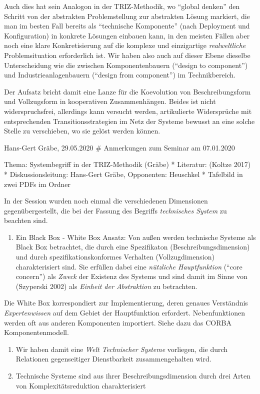 \documentclass[11pt,a4paper]{article}
\begin{document}
Auch dies hat sein Analogon in der TRIZ-Methodik, wo ``global denken''
den Schritt von der abstrakten Problemstellung zur abstrakten Lösung
markiert, die man im besten Fall bereits als ``technische Komponente''
(nach Deployment und Konfiguration) in konkrete Lösungen einbauen kann,
in den meisten Fällen aber noch eine klare Konkretisierung auf die
komplexe und einzigartige \emph{realweltliche} Problemsituation
erforderlich ist. Wir haben also auch auf dieser Ebene dieselbe
Unterscheidung wie die zwischen Komponentenbauern (``design to
component'') und Industrieanlagenbauern (``design from component'') im
Technikbereich.

Der Aufsatz bricht damit eine Lanze für die Koevolution von
Beschreibungsform und Vollzugsform in kooperativen Zusammenhängen.
Beides ist nicht widerspruchsfrei, allerdings kann versucht werden,
artikulierte Widersprüche mit entsprechenden Transitionsstrategien im
Netz der Systeme bewusst an eine solche Stelle zu verschieben, wo sie
gelöst werden können.

Hans-Gert Gräbe, 29.05.2020 \# Anmerkungen zum Seminar am 07.01.2020

Thema: Systembegriff in der TRIZ-Methodik (Gräbe) * Literatur: (Koltze
2017) * Diskussionsleitung: Hans-Gert Gräbe, Opponenten: Heuschkel *
Tafelbild in zwei PDFs im Ordner

In der Session wurden noch einmal die verschiedenen Dimensionen
gegenübergestellt, die bei der Fassung des Begriffs \emph{technisches
System} zu beachten sind.

\begin{enumerate}
[noitemsep]
\item
  Ein Black Box - White Box Ansatz: Von außen werden technische Systeme
  als Black Box betrachtet, die durch eine Spezifikaton
  (Beschreibungsdimension) und durch spezifikationskonformes Verhalten
  (Vollzugdimension) charakterisiert sind. Sie erfüllen dabei eine
  \emph{nützliche Hauptfunktion} (``core concern'') als \emph{Zweck} der
  Existenz des Systems und sind damit im Sinne von (Szyperski 2002) als
  \emph{Einheit der Abstraktion} zu betrachten.
\end{enumerate}

Die White Box korrespondiert zur Implementierung, deren genaues
Verständnis \emph{Expertenwissen} auf dem Gebiet der Hauptfunktion
erfordert. Nebenfunktionen werden oft aus anderen Komponenten
importiert. Siehe dazu das CORBA Komponentenmodell.

\begin{enumerate}
\item
  Wir haben damit eine \emph{Welt Technischer Systeme} vorliegen, die
  durch Relationen gegenseitiger Dienstbarkeit zusammengehalten wird.
\item
  Technische Systeme sind aus ihrer Beschreibungsdimension durch drei
  Arten von Komplexitätsreduktion charakterisiert
\end{enumerate}
\end{document}
